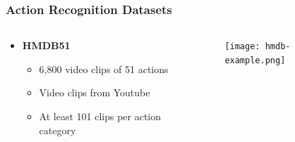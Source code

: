 \documentclass[9pt]{beamer}
\providecommand{\source}{\\ \footnotesize \tugreen{Source:} \footnotemark}
\newenvironment{myframe}[1][]{%
\begin{frame}%
\frametitle{#1}
\setcounter{footnote}{0}


}{%
\end{frame}%
}
\begin{document}
\begin{myframe}[Action Recognition Datasets]
  \begin{columns}[T]
      \begin{column}{.48\textwidth}
          \begin{itemize}
              \item \textbf{HMDB51\footnotemark}
              \begin{itemize}
                  \item 6,800 video clips of 51 actions
                  \item Video clips from Youtube
                  \item At least 101 clips per action category
              \end{itemize}
          \end{itemize}
      \end{column}
      \begin{column}{.48\textwidth}
          \begin{figure}
              \texttt{[image: hmdb-example.png]}
              \source
          \end{figure}
      \end{column}
  \end{columns}
\end{myframe}
\end{document}
